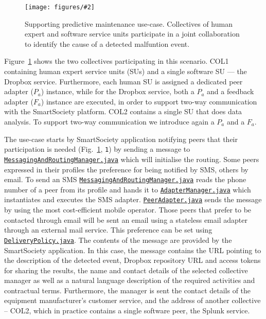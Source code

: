 \documentclass{llncs}
\newcommand{\figfloat}[3][0.9]{
\begin{figure}[h] 
\centering
\texttt{[image: figures/\#2]}
\caption{#3}
\label{fig:#2}
\end{figure}
}
\begin{document}
    \figfloat[.8]{use-case}{
    Supporting predictive maintenance use-case. Collectives of human expert and software service units participate in a joint collaboration to identify the cause of a detected malfuntion event.}
    
    
    Figure~\ref{fig:use-case} shows the two collectives participating in this scenario. COL1 containing human expert service units (SUs) and a single software SU --- the Dropbox service. Furthermore, each human SU is assigned a dedicated peer adapter ($P_a$) instance, while for the Dropbox service, both a $P_a$ and a feedback adapter ($F_a$) instance are executed, in order to support two-way communication with the SmartSociety platform. COL2 contains a single SU that does data analysis. To support two-way communication we introduce again a $P_a$ and a $F_a$.

    The use-case starts by SmartSociety application notifying peers that their participation is needed (Fig.~\ref{fig:use-case}, \texttt{1}\degree) by sending a message to \texttt{\href{https://github.com/tuwiendsg/SmartCom/blob/master/messaging/src/main/java/at/ac/tuwien/dsg/smartcom/messaging/MessagingAndRoutingManagerImpl.java}{MessagingAndRoutingManager.java}} which will initialise the routing. Some peers expressed in their profiles the preference for being notified by SMS, others by email. To send an SMS \texttt{\href{https://github.com/tuwiendsg/SmartCom/blob/master/messaging/src/main/java/at/ac/tuwien/dsg/smartcom/messaging/MessagingAndRoutingManagerImpl.java}{MessagingAndRoutingManager.java}} reads the phone number of a peer from its profile and hands it to \texttt{\href{https://github.com/tuwiendsg/SmartCom/blob/master/adapter/src/main/java/at/ac/tuwien/dsg/smartcom/manager/am/AdapterManagerImpl.java}{AdapterManager.java}} which instantiates and executes the SMS adapter. \texttt{\href{https://github.com/tuwiendsg/SmartCom/blob/master/api/src/main/java/at/ac/tuwien/dsg/smartcom/adapter/OutputAdapter.java}{PeerAdapter.java}} sends the message by using the most cost-efficient mobile operator. Those peers that prefer to be contacted through email will be sent an email using a stateless email adapter through an external mail service. This preference can be set using \texttt{\href{https://github.com/tuwiendsg/SmartCom/blob/master/api/src/main/java/at/ac/tuwien/dsg/smartcom/model/DeliveryPolicy.java}{DeliveryPolicy.java}}.
    The contents of the message are provided by the SmartSociety application. In this case, the message contains the URL pointing to the description of the detected event, Dropbox repository URL and access tokens for sharing the results, the name and contact details of the selected collective manager as well as a natural language description of the required activities and contractual terms. Furthermore, the manager is sent the contact details of the equipment manufacturer's customer service, and the address of another collective -- COL2, which in practice contains a single software peer, the Splunk service.
    
\end{document}
